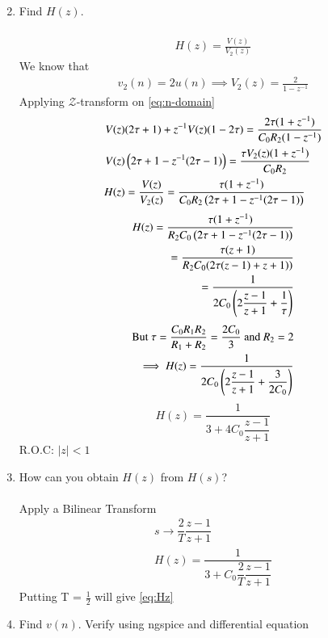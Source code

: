 \documentclass[journal,12pt,twocolumn]{IEEEtran}
\renewcommand\thesection{\arabic{section}}
\begin{document}
\begin{enumerate}[label=\arabic*.,ref=\thesection.\theenumi]
\begin{align}
	\label{eq:n-domain}
\end{align}
\item Find $H(z)$.\\
\solution\\
\begin{align}
	H(z) = \frac{V(z)}{V_2(z)}
\end{align}
We know that 
\begin{align}
	v_2(n) = 2u(n) \implies V_2(z) = \frac{2}{1-z^{-1}}
\end{align}
Applying $\mathcal{Z}$-transform on \eqref{eq:n-domain}
\begin{align}
	V(z)&(2\tau + 1) + z^{-1}V(z)(1 - 2\tau) = \frac{2\tau(1 + z^{-1})}{C_0R_2(1 - z^{-1})}\\
	V(z)&\left(2\tau + 1 -z^{-1}(2\tau - 1)\right) = \frac{\tau V_2(z)(1 + z^{-1})}{C_0R_2}\\
	H(z)& = \frac{V(z)}{V_2(z)} = \frac{\tau(1 + z^{-1})}{C_0R_2\left(2\tau + 1 -z^{-1}(2\tau - 1)\right)}
\end{align}
\begin{align}
	H(z) = \frac{\tau(1 + z^{-1})}{R_2C_0\left(2\tau + 1 -z^{-1}(2\tau - 1)\right)}\\
	= \frac{\tau (z + 1)}{R_2C_0(2\tau(z-1) + z + 1))}\\
	= \dfrac{1}{2C_0\left(2\dfrac{z - 1}{z + 1} + \dfrac{1}{\tau}\right)}
\end{align}
\begin{align}
	\text{But }\tau = \frac{C_0R_1R_2}{R_1 + R_2} = \frac{2C_0}{3} \text{ and } R_2 = 2 \nonumber\\
	\implies H(z) = \dfrac{1}{2C_0\left(2\dfrac{z - 1}{z + 1} + \dfrac{3}{2C_0}\right)}
\end{align}
\begin{equation}
	H(z) = \dfrac{1}{3 + 4C_0\dfrac{z-1}{z+1}}
	\label{eq:Hz}
\end{equation}
R.O.C: $|z| < 1$
\item How can you obtain $H(z)$ from $H(s)$?\\
\solution\\
Apply a Bilinear Transform
\begin{align}
	s \rightarrow \dfrac{2}{T}\dfrac{z-1}{z+1}\\
	H(z) = \dfrac{1}{3 + C_0\dfrac{2}{T}\dfrac{z-1}{z+1}}
\end{align}
Putting T = $\frac{1}{2}$ will give \eqref{eq:Hz}\\
\item Find $v(n)$. Verify using ngspice and differential equation\\

\end{enumerate}
\end{document}
